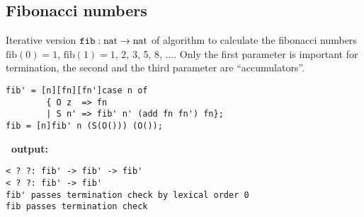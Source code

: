 \subsection{Fibonacci numbers\label{ex:fib}}
Iterative version
$\mathtt{fib}: \mathrm{nat} \rightarrow \mathrm{nat}$
of algorithm to calculate the fibonacci numbers
$\mathrm{fib}(0)=1$, $\mathrm{fib}(1)=1$, 2, 3, 5, 8, $\dots$. Only
the first parameter is important for termination, the
second and the third parameter are ``accumulators''.
\begin{verbatim}
fib' = [n][fn][fn']case n of
        { O z  => fn
        | S n' => fib' n' (add fn fn') fn};
fib = [n]fib' n (S(O())) (O());
\end{verbatim}
{\bf \foetus\ output:}\nopagebreak
\begin{verbatim}
< ? ?: fib' -> fib' -> fib'
< ? ?: fib' -> fib'
fib' passes termination check by lexical order 0
fib passes termination check
\end{verbatim}

